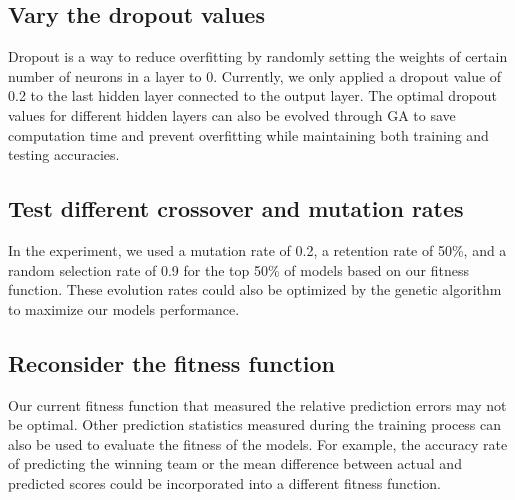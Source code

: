 \documentclass[10pt,twocolumn,letterpaper]{article}
\begin{document}
\subsection{Vary the dropout values}
Dropout is a way to reduce overfitting by randomly setting the weights of certain number of neurons in a layer to 0. Currently, we only applied a dropout value of 0.2 to the last hidden layer connected to the output layer. The optimal dropout values for different hidden layers can also be evolved through GA to save computation time and prevent overfitting while maintaining both training and testing accuracies.

\subsection{Test different crossover and mutation rates}
In the experiment, we used a mutation rate of 0.2, a retention rate of 50\%, and a random selection rate of 0.9 for the top 50\% of models based on our fitness function.  These evolution rates could also be optimized by the genetic algorithm to maximize our models performance.

\subsection{Reconsider the fitness function}
Our current fitness function that measured the relative prediction errors may not be optimal. Other prediction statistics measured during the training process can also be used to evaluate the fitness of the models. For example, the accuracy rate of predicting the winning team or the mean difference between actual and predicted scores could be incorporated into a different fitness function.




\end{document}
